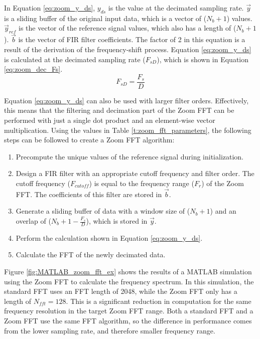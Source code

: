 In Equation \ref{eq:zoom_y_ds},  $y_{ds}$ is the value at the decimated sampling rate.  $\vec{y}$ is a sliding buffer of the original input data, which is a vector of ($N_b+1$) values.  $\vec{y}_{ref}$ is the vector of the reference signal values, which also has a length of ($N_b+1$).  $\vec{b}$ is the vector of FIR filter coefficients.  The factor of 2 in this equation is a result of the derivation of the frequency-shift process.  Equation \ref{eq:zoom_y_ds} is calculated at the decimated sampling rate ($F_{sD}$), which is shown in Equation \ref{eq:zoom_dec_Fs}.
\begin{equation} \label{eq:zoom_dec_Fs}
	F_{sD} = \frac{F_s}{D}
\end{equation}

Equation \ref{eq:zoom_y_ds} can also be used with larger filter orders.  Effectively, this means that the filtering and decimation part of the Zoom FFT can be performed with just a single dot product and an element-wise vector multiplication.  Using the values in Table \ref{t:zoom_fft_parameters}, the following steps can be followed to create a Zoom FFT algorithm:
\begin{enumerate}
	\item Precompute the unique values of the reference signal during initialization.
	\item Design a FIR filter with an appropriate cutoff frequency and filter order.  The cutoff frequency ($F_{cutoff}$) is equal to the frequency range ($F_r$) of the Zoom FFT.  The coefficients of this filter are stored in $\vec{b}$.
	\item Generate a sliding buffer of data with a window size of ($N_b+1$) and an overlap of ($N_b+1 - \frac{F_s}{D}$), which is stored in $\vec{y}$.
	\item Perform the calculation shown in Equation \ref{eq:zoom_y_ds}.
	\item Calculate the FFT of the newly decimated data.
\end{enumerate}

Figure \ref{fig:MATLAB_zoom_fft_ex} shows the results of a MATLAB simulation using the Zoom FFT to calculate the frequency spectrum.  In this simulation, the standard FFT uses an FFT length of 2048, while the Zoom FFT only has a length of $N_{fft}=128$.  This is a significant reduction in computation for the same frequency resolution in the target Zoom FFT range.  Both a standard FFT and a Zoom FFT use the same FFT algorithm, so the difference in performance comes from the lower sampling rate, and therefore smaller frequency range.

